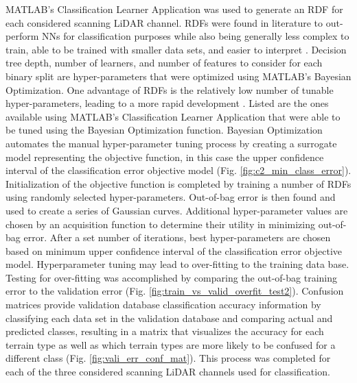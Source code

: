 \documentclass[journal,onecolumn]{IEEEtran}
\begin{document}
			{MATLAB's Classification Learner Application was used to generate an RDF for each considered scanning LiDAR channel. RDFs were found in literature to out-perform NNs for classification purposes \cite{fernandez_delgado_we_nodate} while also being generally less complex to train, able to be trained with smaller data sets, and easier to interpret \cite{nawar_comparison_2017, rosbach_neural_nodate, rosbach_neural_nodate, ahmad_trees_2017}. Decision tree depth, number of learners, and number of features to consider for each binary split are hyper-parameters that were optimized using MATLAB's Bayesian Optimization. One advantage of RDFs is the relatively low number of tunable hyper-parameters, leading to a more rapid development \cite{nawar_comparison_2017, rosbach_neural_nodate, rosbach_neural_nodate, ahmad_trees_2017}. Listed are the ones available using MATLAB's Classification Learner Application that were able to be tuned using the Bayesian Optimization function. Bayesian Optimization automates the manual hyper-parameter tuning process by creating a surrogate model representing the objective function, in this case the upper confidence interval of the classification error objective model (Fig. \ref{fig:c2_min_class_error}). Initialization of the objective function is completed by training a number of RDFs using randomly selected hyper-parameters. Out-of-bag error is then found and used to create a series of Gaussian curves. Additional hyper-parameter values are chosen by an acquisition function to determine their utility in minimizing out-of-bag error. After a set number of iterations, best hyper-parameters are chosen based on minimum upper confidence interval of the classification error objective model. Hyperparameter tuning may lead to over-fitting to the training data base. Testing for over-fitting was accomplished by comparing the out-of-bag training error to the validation error (Fig. \ref{fig:train_vs_valid_overfit_test2}). Confusion matrices provide validation database classification accuracy information by classifying each data set in the validation database and comparing actual and predicted classes, resulting in a matrix that visualizes the accuracy for each terrain type as well as which terrain types are more likely to be confused for a different class (Fig. \ref{fig:vali_err_conf_mat}). This process was completed for each of the three considered scanning LiDAR channels used for classification.}
\end{document}
